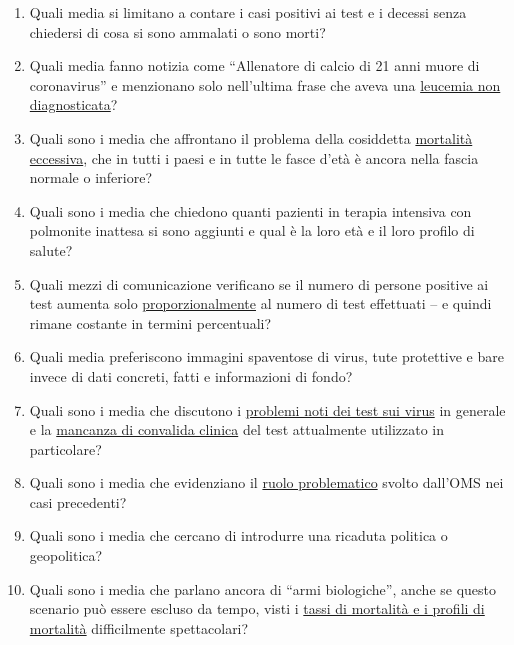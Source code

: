 \begin{enumerate}
\def\labelenumi{\arabic{enumi}.}
\tightlist
\item
  Quali media si limitano a contare i casi positivi ai test e i decessi
  senza chiedersi di cosa si sono ammalati o sono morti?
\item
  Quali media fanno notizia come ``Allenatore di calcio di 21 anni muore
  di coronavirus'' e menzionano solo nell'ultima frase che aveva una
  \href{https://www.msn.com/de-ch/news/other/spanischer-nachwuchs-trainer-stirbt-an-corona/ar-BB11gT64}{leucemia
  non diagnosticata}?
\item
  Quali sono i media che affrontano il problema della cosiddetta
  \href{https://www.euromomo.eu/index.html}{mortalità eccessiva}, che in
  tutti i paesi e in tutte le fasce d'età è ancora nella fascia normale
  o inferiore?
\item
  Quali sono i media che chiedono quanti pazienti in terapia intensiva
  con polmonite inattesa si sono aggiunti e qual è la loro età e il loro
  profilo di salute?
\item
  Quali mezzi di comunicazione verificano se il numero di persone
  positive ai test aumenta solo
  \href{https://multipolar-magazin.de/artikel/coronavirus-irrefuhrung-fallzahlen}{proporzionalmente}
  al numero di test effettuati -- e quindi rimane costante in termini
  percentuali?
\item
  Quali media preferiscono immagini spaventose di virus, tute protettive
  e bare invece di dati concreti, fatti e informazioni di fondo?
\item
  Quali sono i media che discutono i
  \href{https://www.ncbi.nlm.nih.gov/pmc/articles/PMC2095096/}{problemi
  noti dei test sui virus} in generale e la
  \href{https://www.creative-diagnostics.com/sars-cov-2-coronavirus-multiplex-rt-qpcr-kit-277854-457.htm}{mancanza
  di convalida clinica} del test attualmente utilizzato in particolare?
\item
  Quali sono i media che evidenziano il
  \href{https://www.forbes.com/2010/02/05/world-health-organization-swine-flu-pandemic-opinions-contributors-michael-fumento.html\#78102efc48e8}{ruolo
  problematico} svolto dall'OMS nei casi precedenti?
\item
  Quali sono i media che cercano di introdurre una ricaduta politica o
  geopolitica?
\item
  Quali sono i media che parlano ancora di ``armi biologiche'', anche se
  questo scenario può essere escluso da tempo, visti i
  \href{https://www.statnews.com/2020/03/17/a-fiasco-in-the-making-as-the-coronavirus-pandemic-takes-hold-we-are-making-decisions-without-reliable-data/}{tassi
  di mortalità e i profili di mortalità} difficilmente spettacolari?
\end{enumerate}

